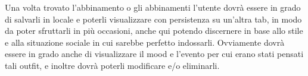 Una volta trovato l'abbinamento o gli abbinamenti l'utente dovrà essere in grado di salvarli in locale e poterli visualizzare con persistenza su un'altra tab, in modo da poter sfruttarli in più occasioni, anche qui potendo discernere in base allo stile e alla situazione sociale in cui sarebbe perfetto indossarli. Ovviamente dovrà essere in grado anche di visualizzare il mood e l'evento per cui erano stati pensati tali outfit, e inoltre dovrà poterli modificare e/o eliminarli.  
